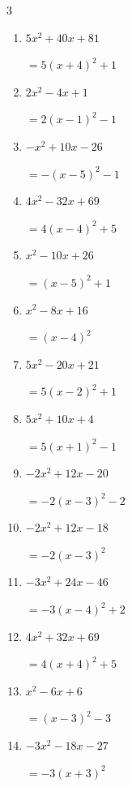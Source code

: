 \begin{multicols}{3}
\begin{enumerate}
        $=2\left( x-5\right)^{2}-3$

  \item $5x^{2}+40x+81$

        $=5\left( x+4\right)^{2}+1$

  \item $2x^{2}-4x+1$

        $=2\left( x-1\right)^{2}-1$

  \item $-x^{2}+10x-26$

        $=-\left( x-5\right)^{2}-1$

  \item $4x^{2}-32x+69$

        $=4\left( x-4\right)^{2}+5$

\columnbreak %

  \item $x^{2}-10x+26$

        $=\left( x-5\right)^{2}+1$

  \item $x^{2}-8x+16$

        $=\left( x-4\right)^{2}$

  \item $5x^{2}-20x+21$

        $=5\left( x-2\right)^{2}+1$

  \item $5x^{2}+10x+4$

        $=5\left( x+1\right)^{2}-1$

  \item $-2x^{2}+12x-20$

        $=-2\left( x-3\right)^{2}-2$

  \item $-2x^{2}+12x-18$

        $=-2\left( x-3\right)^{2}$

  \item $-3x^{2}+24x-46$

        $=-3\left( x-4\right)^{2}+2$

  \item $4x^{2}+32x+69$

        $=4\left( x+4\right)^{2}+5$

  \item $x^{2}-6x+6$

        $=\left( x-3\right)^{2}-3$

  \item $-3x^{2}-18x-27$

        $=-3\left( x+3\right)^{2}$


\end{enumerate}
\end{multicols}
